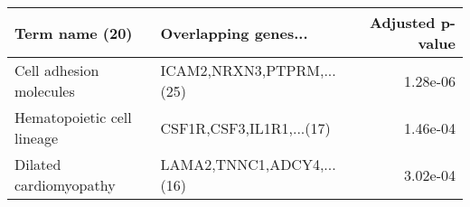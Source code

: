 \begin{tabular}{llr}
\toprule
            Term name (20) &      Overlapping genes... &  Adjusted p-value \\
\midrule
   Cell adhesion molecules & ICAM2,NRXN3,PTPRM,...(25) &          1.28e-06 \\
Hematopoietic cell lineage &  CSF1R,CSF3,IL1R1,...(17) &          1.46e-04 \\
    Dilated cardiomyopathy & LAMA2,TNNC1,ADCY4,...(16) &          3.02e-04 \\
\bottomrule
\end{tabular}
